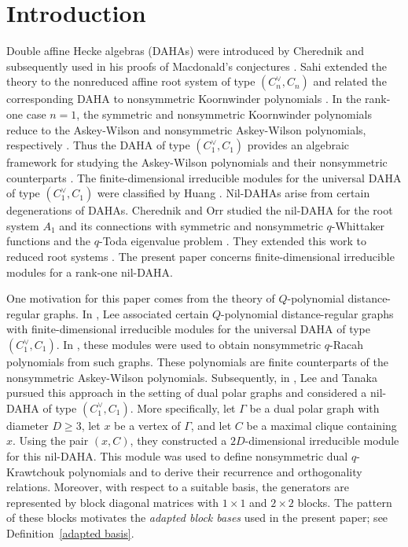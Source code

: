 \documentclass[reqno]{amsart}
\theoremstyle{definition}
\begin{document}
\section{Introduction}

Double affine Hecke algebras (DAHAs) were introduced by Cherednik
\cite{Cherednik1992} and subsequently used in his proofs of Macdonald's
conjectures \cite{Cherednik1995AnnM,Cherednik1995InvM}.
Sahi extended the theory to the nonreduced affine root system of type
$(C_n^\vee,C_n)$ and related the corresponding DAHA to nonsymmetric
Koornwinder polynomials \cite{Sahi1999}.
In the rank-one case $n=1$, the symmetric and
nonsymmetric Koornwinder polynomials reduce to the Askey-Wilson and nonsymmetric Askey-Wilson polynomials, respectively
\cite[Sections~6.5,~6.6]{Macdonald2003}.
Thus the DAHA of type $(C_1^\vee,C_1)$ provides an algebraic framework
for studying the Askey-Wilson polynomials and their nonsymmetric
counterparts \cite{NoumiStokman2004}.
The finite-dimensional irreducible modules for the universal DAHA of type
$(C_1^\vee,C_1)$ were classified by Huang \cite{Huang}.
Nil-DAHAs arise from certain degenerations of DAHAs.
Cherednik and Orr studied the nil-DAHA for the root system $A_1$ and its
connections with symmetric and nonsymmetric $q$-Whittaker functions and
the $q$-Toda eigenvalue problem
\cite{CherednikOrr2012,CherednikOrr2013}.
They extended this work to reduced root systems
\cite{CherednikOrr2015}.
The present paper concerns finite-dimensional irreducible modules for a
rank-one nil-DAHA.

One motivation for this paper comes from the theory of $Q$-polynomial
distance-regular graphs.
In \cite{Lee2013}, Lee associated certain $Q$-polynomial
distance-regular graphs with finite-dimensional irreducible modules for
the universal DAHA of type $(C_1^\vee,C_1)$.
In \cite{Lee2017}, these modules were used to obtain nonsymmetric
$q$-Racah polynomials from such graphs.
These polynomials are finite counterparts of the nonsymmetric
Askey-Wilson polynomials.
Subsequently, in \cite{LeeTanaka}, Lee and Tanaka pursued
this approach in the setting of dual polar graphs and considered a
nil-DAHA of type $(C_1^\vee,C_1)$.
More specifically, let $\Gamma$ be a dual polar graph with diameter
$D\geq 3$, let $x$ be a vertex of $\Gamma$, and let $C$ be a maximal
clique containing $x$.
Using the pair $(x,C)$, they constructed a $2D$-dimensional irreducible
module for this nil-DAHA.
This module was used to define nonsymmetric dual $q$-Krawtchouk
polynomials and to derive their recurrence and orthogonality relations.
Moreover, with respect to a suitable basis, the generators are represented
by block diagonal matrices with $1\times 1$ and $2\times 2$ blocks.
The pattern of these blocks motivates the \emph{adapted block bases} used in
the present paper; see Definition~\ref{adapted basis}.
\end{document}
